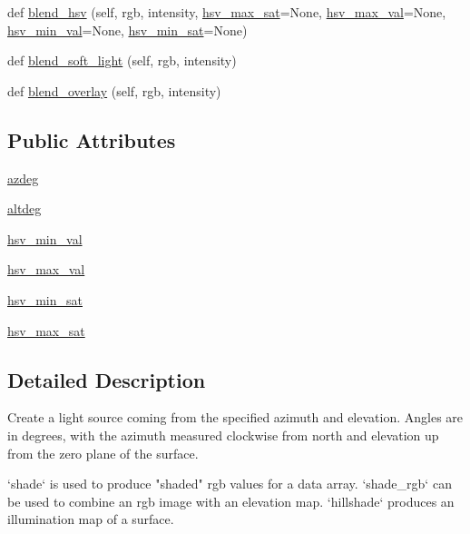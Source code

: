 \begin{DoxyCompactItemize}
\item 
def \hyperlink{classmatplotlib_1_1colors_1_1LightSource_a5111ad7bc8b948ff94ed9995a9e25a11}{blend\+\_\+hsv} (self, rgb, intensity, \hyperlink{classmatplotlib_1_1colors_1_1LightSource_af495af78687fda8abd0c4a94b9ebb7ac}{hsv\+\_\+max\+\_\+sat}=None, \hyperlink{classmatplotlib_1_1colors_1_1LightSource_a5471de9515029d4224f86972aa459e81}{hsv\+\_\+max\+\_\+val}=None, \hyperlink{classmatplotlib_1_1colors_1_1LightSource_aa1fa26d6651f24ebd79c5faa0ab204b0}{hsv\+\_\+min\+\_\+val}=None, \hyperlink{classmatplotlib_1_1colors_1_1LightSource_af935fb94e31a3e49d91816818fcc078f}{hsv\+\_\+min\+\_\+sat}=None)
\item 
def \hyperlink{classmatplotlib_1_1colors_1_1LightSource_ac3fb1dce58f1e80de2f168bccaf36ccd}{blend\+\_\+soft\+\_\+light} (self, rgb, intensity)
\item 
def \hyperlink{classmatplotlib_1_1colors_1_1LightSource_a0c50b1c06aeafa8731c651e4281d2e0b}{blend\+\_\+overlay} (self, rgb, intensity)
\end{DoxyCompactItemize}
\subsection*{Public Attributes}
\begin{DoxyCompactItemize}
\item 
\hyperlink{classmatplotlib_1_1colors_1_1LightSource_a882cb0069579a96b1cbee030da7e6dcf}{azdeg}
\item 
\hyperlink{classmatplotlib_1_1colors_1_1LightSource_a2777dfac6339c6a79f36de3caa2f81de}{altdeg}
\item 
\hyperlink{classmatplotlib_1_1colors_1_1LightSource_aa1fa26d6651f24ebd79c5faa0ab204b0}{hsv\+\_\+min\+\_\+val}
\item 
\hyperlink{classmatplotlib_1_1colors_1_1LightSource_a5471de9515029d4224f86972aa459e81}{hsv\+\_\+max\+\_\+val}
\item 
\hyperlink{classmatplotlib_1_1colors_1_1LightSource_af935fb94e31a3e49d91816818fcc078f}{hsv\+\_\+min\+\_\+sat}
\item 
\hyperlink{classmatplotlib_1_1colors_1_1LightSource_af495af78687fda8abd0c4a94b9ebb7ac}{hsv\+\_\+max\+\_\+sat}
\end{DoxyCompactItemize}


\subsection{Detailed Description}
\begin{DoxyVerb}Create a light source coming from the specified azimuth and elevation.
Angles are in degrees, with the azimuth measured
clockwise from north and elevation up from the zero plane of the surface.

`shade` is used to produce "shaded" rgb values for a data array.
`shade_rgb` can be used to combine an rgb image with an elevation map.
`hillshade` produces an illumination map of a surface.
\end{DoxyVerb}
 

